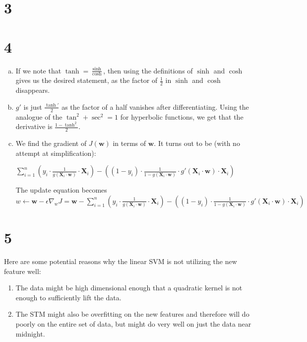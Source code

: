 \documentclass[11pt, parindent=0]{article}
\begin{document}
\section{3}
\label{sec:3}


\section{4}
\label{sec:4}

\begin{enumerate}[(a)]
    \item If we note that $\tanh = \frac{\sinh}{\cosh}$, then using the definitions of $\sinh$ and $\cosh$ gives us the desired statement, as the factor of $\frac{1}{2}$ in $\sinh$ and $\cosh$ disappears.

    \item $g'$ is just $\frac{\tanh'}{2}$ as the factor of a half vanishes after differentiating. Using the analogue of the $\tan^2+\sec^2=1$ for hyperbolic functions, we get that the derivative is $ \frac{1-\tanh^2}{2} $.

    \item We find the gradient of $J(\textbf{w})$ in terms of $\textbf{w}$. It turns out to be (with no attempt at simplification):

        $ \sum\limits_{i=1}^{n}
        (y_i \cdot
        \frac
        {1}
        {g(
            \textbf{X}_i \cdot \textbf{w}
    )}
    \cdot \textbf{X}_i)
        -
        ((1-y_i) \cdot \frac{1}{1-g(\textbf{X}_i \cdot \textbf{w})} \cdot g'(\textbf{X}_i \cdot \textbf{w}) \cdot \textbf{X}_i )
        $

        The update equation becomes
        $ w \leftarrow \textbf{w} - \epsilon\nabla_wJ = \textbf{w} -\sum\limits_{i=1}^{n}
        (y_i \cdot
        \frac
        {1}
        {g(
        \textbf{X}_i \cdot \textbf{w}
        )}
    \cdot \textbf{X}_i)
    -
    ((1-y_i) \cdot \frac{1}{1-g(\textbf{X}_i \cdot \textbf{w})} \cdot g'(\textbf{X}_i \cdot \textbf{w}) \cdot \textbf{X}_i )
        $
\end{enumerate}

\section{5}
\label{sec:5}

Here are some potential reasons why the linear SVM is not utilizing the new feature well:
\begin{enumerate}[1.]
    \item The data might be high dimensional enough that a quadratic kernel is not enough to sufficiently lift the data.

    \item The STM might also be overfitting on the new features and therefore will do poorly on the entire set of data, but might do very well on just the data near midnight.

\end{enumerate}
\end{document}
